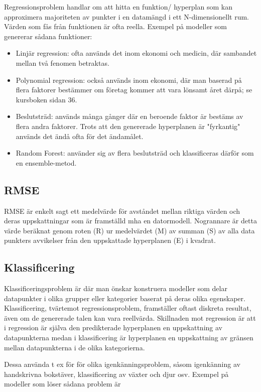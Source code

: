\documentclass[10pt]{article}
\begin{document}
Regressionsproblem handlar om att hitta en funktion/ hyperplan som kan approximera majoriteten av punkter i en datamängd i ett N-dimensionellt rum.  Värden som fås från funktionen är ofta reella. Exempel på modeller som genererar sådana funktioner:
\begin{itemize}
	\item Linjär regression: ofta används det inom ekonomi och medicin, där sambandet mellan två fenomen betraktas.
	\item Polynomial regression: också används inom ekonomi, där man baserad på flera faktorer bestämmer om företag kommer att vara lönsamt året därpå; se kursboken sidan 36.
	\item Beslutsträd: används många gånger där en beroende faktor är bestäms av flera andra faktorer. Trots att den genererade hyperplanen är "fyrkantig" används det ändå ofta för det ändamålet.
	\item Random Forest: använder sig av flera beslutsträd och klassificeras därför som en ensemble-metod.
\end{itemize}

\subsection{RMSE}

RMSE är enkelt sagt ett medelvärde för avståndet mellan riktiga värden och deras uppskattningar som är framställd mha en datormodell. Nogrannare är detta värde beräknat genom roten (R) ur medelvärdet (M) av summan (S) av alla data punkters avvikelser från den uppskattade hyperplanen (E) i kvadrat.

\subsection{Klassificering}

Klassificeringsproblem är där man önskar konstruera modeller som delar datapunkter i olika grupper eller kategorier baserat på deras olika egenskaper. Klassificering, tvärtemot regressionsproblem, framställer oftast diskreta resultat, även om de genererade talen kan vara reellvärda. Skillnaden mot regression är att i regression är själva den predikterade hyperplanen en uppskattning av datapunkterna medan i klassificering är hyperplanen en uppskattning av gränsen mellan datapunkterna i de olika kategorierna.

Dessa använda t ex för för olika igenkänningsproblem, såsom igenkänning av handskrivna bokstäver, klassificering av växter och djur osv. Exempel på modeller som löser sådana problem är
\end{document}
